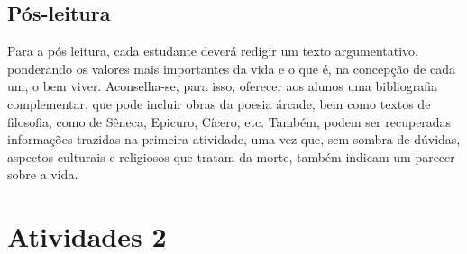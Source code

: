 \documentclass[12pt]{extarticle}
\begin{document}
\subsection{Pós-leitura}



Para a pós leitura, cada estudante deverá redigir um texto
argumentativo, ponderando os valores mais importantes da vida e o que é,
na concepção de cada um, o bem viver. Aconselha-se, para isso, oferecer
aos alunos uma bibliografia complementar, que pode incluir obras da
poesia árcade, bem como textos de filosofia, como de Sêneca, Epicuro,
Cícero, etc. Também, podem ser recuperadas informações trazidas na
primeira atividade, uma vez que, sem sombra de dúvidas, aspectos
culturais e religiosos que tratam da morte, também indicam um parecer
sobre a vida.

\section{Atividades 2}

\end{document}
